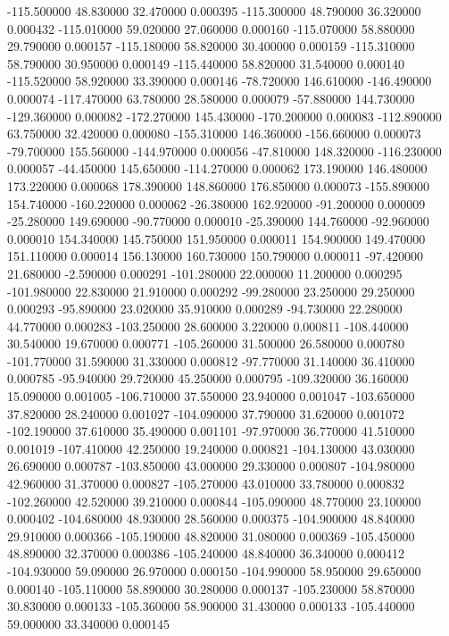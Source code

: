 -115.500000 48.830000 32.470000 0.000395 
-115.300000 48.790000 36.320000 0.000432 
-115.010000 59.020000 27.060000 0.000160 
-115.070000 58.880000 29.790000 0.000157 
-115.180000 58.820000 30.400000 0.000159 
-115.310000 58.790000 30.950000 0.000149 
-115.440000 58.820000 31.540000 0.000140 
-115.520000 58.920000 33.390000 0.000146 
-78.720000 146.610000 -146.490000 0.000074 
-117.470000 63.780000 28.580000 0.000079 
-57.880000 144.730000 -129.360000 0.000082 
-172.270000 145.430000 -170.200000 0.000083 
-112.890000 63.750000 32.420000 0.000080 
-155.310000 146.360000 -156.660000 0.000073 
-79.700000 155.560000 -144.970000 0.000056 
-47.810000 148.320000 -116.230000 0.000057 
-44.450000 145.650000 -114.270000 0.000062 
173.190000 146.480000 173.220000 0.000068 
178.390000 148.860000 176.850000 0.000073 
-155.890000 154.740000 -160.220000 0.000062 
-26.380000 162.920000 -91.200000 0.000009 
-25.280000 149.690000 -90.770000 0.000010 
-25.390000 144.760000 -92.960000 0.000010 
154.340000 145.750000 151.950000 0.000011 
154.900000 149.470000 151.110000 0.000014 
156.130000 160.730000 150.790000 0.000011 
-97.420000 21.680000 -2.590000 0.000291 
-101.280000 22.000000 11.200000 0.000295 
-101.980000 22.830000 21.910000 0.000292 
-99.280000 23.250000 29.250000 0.000293 
-95.890000 23.020000 35.910000 0.000289 
-94.730000 22.280000 44.770000 0.000283 
-103.250000 28.600000 3.220000 0.000811 
-108.440000 30.540000 19.670000 0.000771 
-105.260000 31.500000 26.580000 0.000780 
-101.770000 31.590000 31.330000 0.000812 
-97.770000 31.140000 36.410000 0.000785 
-95.940000 29.720000 45.250000 0.000795 
-109.320000 36.160000 15.090000 0.001005 
-106.710000 37.550000 23.940000 0.001047 
-103.650000 37.820000 28.240000 0.001027 
-104.090000 37.790000 31.620000 0.001072 
-102.190000 37.610000 35.490000 0.001101 
-97.970000 36.770000 41.510000 0.001019 
-107.410000 42.250000 19.240000 0.000821 
-104.130000 43.030000 26.690000 0.000787 
-103.850000 43.000000 29.330000 0.000807 
-104.980000 42.960000 31.370000 0.000827 
-105.270000 43.010000 33.780000 0.000832 
-102.260000 42.520000 39.210000 0.000844 
-105.090000 48.770000 23.100000 0.000402 
-104.680000 48.930000 28.560000 0.000375 
-104.900000 48.840000 29.910000 0.000366 
-105.190000 48.820000 31.080000 0.000369 
-105.450000 48.890000 32.370000 0.000386 
-105.240000 48.840000 36.340000 0.000412 
-104.930000 59.090000 26.970000 0.000150 
-104.990000 58.950000 29.650000 0.000140 
-105.110000 58.890000 30.280000 0.000137 
-105.230000 58.870000 30.830000 0.000133 
-105.360000 58.900000 31.430000 0.000133 
-105.440000 59.000000 33.340000 0.000145 
